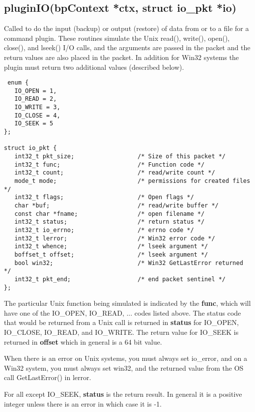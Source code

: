 \subsection{pluginIO(bpContext *ctx, struct io\_pkt *io)}
Called to do the input (backup) or output (restore) of data from or to a file
for a command plugin. These routines simulate the Unix read(), write(), open(),
close(), and lseek() I/O calls, and the arguments are passed in the packet and
the return values are also placed in the packet.  In addition for Win32 systems
the plugin must return two additional values (described below).

\begin{verbatim}
 enum {
   IO_OPEN = 1,
   IO_READ = 2,
   IO_WRITE = 3,
   IO_CLOSE = 4,
   IO_SEEK = 5
};

struct io_pkt {
   int32_t pkt_size;                  /* Size of this packet */
   int32_t func;                      /* Function code */
   int32_t count;                     /* read/write count */
   mode_t mode;                       /* permissions for created files */
   int32_t flags;                     /* Open flags */
   char *buf;                         /* read/write buffer */
   const char *fname;                 /* open filename */
   int32_t status;                    /* return status */
   int32_t io_errno;                  /* errno code */
   int32_t lerror;                    /* Win32 error code */
   int32_t whence;                    /* lseek argument */
   boffset_t offset;                  /* lseek argument */
   bool win32;                        /* Win32 GetLastError returned */
   int32_t pkt_end;                   /* end packet sentinel */
};
\end{verbatim}

The particular Unix function being simulated is indicated by the {\bf func},
which will have one of the IO\_OPEN, IO\_READ, ... codes listed above.  The
status code that would be returned from a Unix call is returned in {\bf status}
for IO\_OPEN, IO\_CLOSE, IO\_READ, and IO\_WRITE. The return value for IO\_SEEK
is returned in {\bf offset} which in general is a 64 bit value.

When there is an error on Unix systems, you must always set io\_error, and
on a Win32 system, you must always set win32, and the returned value from
the OS call GetLastError() in lerror.

For all except IO\_SEEK, {\bf status} is the return result.  In general it is
a positive integer unless there is an error in which case it is -1.

